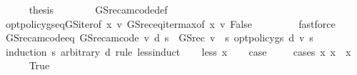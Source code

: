 \begin{isabellebody}
\ \ \ \ \isamarkupfalse%
\ {\isacharquery}{\kern0pt}thesis\isanewline
\ \ \ \ \ \ \isamarkupfalse%
\ GS{\isacharunderscore}{\kern0pt}rec{\isacharunderscore}{\kern0pt}am{\isacharunderscore}{\kern0pt}code{\isacharunderscore}{\kern0pt}def\isanewline
\ \ \ \ \ \ \isamarkupfalse%
\ opt{\isacharunderscore}{\kern0pt}policy{\isacharunderscore}{\kern0pt}gs{\isacharprime}{\kern0pt}{\isacharunderscore}{\kern0pt}eq{\isacharunderscore}{\kern0pt}GS{\isacharunderscore}{\kern0pt}iter{\isacharbrackleft}{\kern0pt}of\ x\ v{\isacharbrackright}{\kern0pt}\ GS{\isacharunderscore}{\kern0pt}rec{\isacharunderscore}{\kern0pt}eq{\isacharunderscore}{\kern0pt}iter{\isacharunderscore}{\kern0pt}max{\isacharbrackleft}{\kern0pt}of\ x\ v{\isacharbrackright}{\kern0pt}\ False\ \isanewline
\ \ \ \ \ \ \isamarkupfalse%
\ fastforce\isanewline
\ \ \isamarkupfalse%
\isanewline
{}\isamarkupfalse%
%
\endisatagproof
{\isafoldproof}%
%
\isadelimproof
\isanewline
%
\endisadelimproof
\isanewline
{}\isamarkupfalse%
\ GS{\isacharunderscore}{\kern0pt}rec{\isacharunderscore}{\kern0pt}am{\isacharunderscore}{\kern0pt}code{\isacharunderscore}{\kern0pt}eq{\isacharcolon}{\kern0pt}\ {\isachardoublequoteopen}GS{\isacharunderscore}{\kern0pt}rec{\isacharunderscore}{\kern0pt}am{\isacharunderscore}{\kern0pt}code\ v\ d\ s\ {\isacharequal}{\kern0pt}\ {\isacharparenleft}{\kern0pt}GS{\isacharunderscore}{\kern0pt}rec\ v\ {\isachardollar}{\kern0pt}\ s{\isacharcomma}{\kern0pt}\ opt{\isacharunderscore}{\kern0pt}policy{\isacharunderscore}{\kern0pt}gs{\isacharprime}{\kern0pt}\ d\ v\ s{\isacharparenright}{\kern0pt}{\isachardoublequoteclose}\isanewline
%
\isadelimproof
%
\endisadelimproof
%
\isatagproof
{}\isamarkupfalse%
\ {\isacharparenleft}{\kern0pt}induction\ s\ arbitrary{\isacharcolon}{\kern0pt}\ d\ rule{\isacharcolon}{\kern0pt}\ less{\isacharunderscore}{\kern0pt}induct{\isacharparenright}{\kern0pt}\isanewline
\ \ \isamarkupfalse%
\ {\isacharparenleft}{\kern0pt}less\ x{\isacharparenright}{\kern0pt}\isanewline
\ \ \isamarkupfalse%
\ {\isacharquery}{\kern0pt}case\ \isanewline
\ \ \isamarkupfalse%
\ {\isacharparenleft}{\kern0pt}cases\ {\isachardoublequoteopen}{\isasymexists}x{\isacharprime}{\kern0pt}{\isachardot}{\kern0pt}\ x{\isacharprime}{\kern0pt}\ {\isacharless}{\kern0pt}\ x{\isachardoublequoteclose}{\isacharparenright}{\kern0pt}\isanewline
\ \ \ \ \isamarkupfalse%
\ True\isanewline
\ \ \ \ \isamarkupfalse%

\end{isabellebody}
